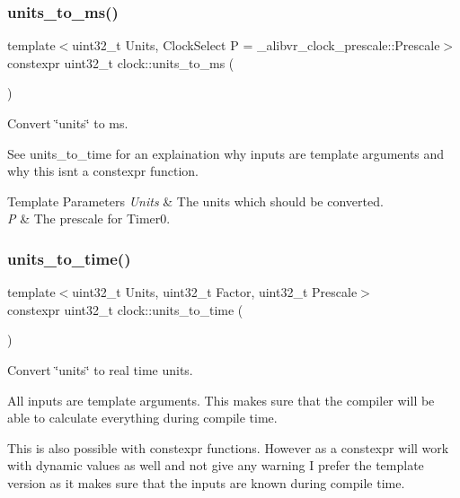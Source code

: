 \subsubsection{\texorpdfstring{units\+\_\+to\+\_\+ms()}{units\_to\_ms()}}
{\footnotesize\ttfamily template$<$uint32\+\_\+t Units, Clock\+Select P = \+\_\+alibvr\+\_\+clock\+\_\+prescale\+::\+Prescale$>$ \\
constexpr uint32\+\_\+t clock\+::units\+\_\+to\+\_\+ms (\begin{DoxyParamCaption}{ }\end{DoxyParamCaption})\hspace{0.3cm}{\ttfamily [inline]}}



Convert \char`\"{}units\char`\"{} to ms. 

See units\+\_\+to\+\_\+time for an explaination why inputs are template arguments and why this isn\textquotesingle{}t a constexpr function.


\begin{DoxyTemplParams}{Template Parameters}
{\em Units} & The units which should be converted. \\
\hline
{\em P} & The prescale for {\ttfamily Timer0}. \\
\hline
\end{DoxyTemplParams}
\hypertarget{namespaceclock_ae4ee0d04356b216b1d04046c0e1b2d38}{}\label{namespaceclock_ae4ee0d04356b216b1d04046c0e1b2d38} 
\subsubsection{\texorpdfstring{units\+\_\+to\+\_\+time()}{units\_to\_time()}}
{\footnotesize\ttfamily template$<$uint32\+\_\+t Units, uint32\+\_\+t Factor, uint32\+\_\+t Prescale$>$ \\
constexpr uint32\+\_\+t clock\+::units\+\_\+to\+\_\+time (\begin{DoxyParamCaption}{ }\end{DoxyParamCaption})}



Convert \char`\"{}units\char`\"{} to real time units. 

All inputs are template arguments. This makes sure that the compiler will be able to calculate everything during compile time.

This is also possible with {\ttfamily constexpr} functions. However as a {\ttfamily constexpr} will work with dynamic values as well and not give any warning I prefer the template version as it makes sure that the inputs are known during compile time.

